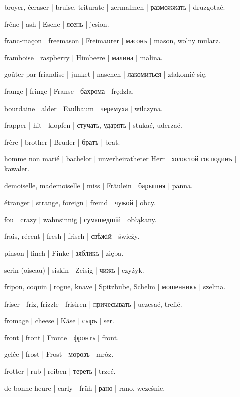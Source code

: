 \begin{outdent}{1em}
broyer, écraser | bruise, triturate | zermalmen | разможжать | druzgotać.

frêne | ash | Esche | ясень | jesion.

franc-maçon | freemason | Freimaurer | масонъ | mason,
wolny mularz.

framboise | raspberry | Himbeere | малина | malina.

goûter par friandise | junket | naschen | лакомиться | złakomić się.

frange | fringe | Franse | бахрома | frędzla.

bourdaine | alder | Faulbaum | черемуха | wilczyna.

frapper | hit | klopfen | стучать, ударять | stukać, uderzać.

frère | brother | Bruder | братъ | brat.

homme non marié | bachelor | unverheiratheter Herr | холостой
господинъ | kawaler.

\uvsubentry{}
demoiselle, mademoiselle | miss | Fräulein | барышня | panna.

étranger | strange, foreign | fremd | чужой | obcy.

fou | crazy | wahnsinnig | сумашедшій | obłąkany.

frais, récent | fresh | frisch | свѣжій | świeźy.

pinson | finch | Finke | зябликъ | zięba.

serin (oiseau) | siskin | Zeisig | чижъ | czyźyk.

fripon, coquin | rogue, knave | Spitzbube, Schelm | мошенникъ | szelma.

friser | friz, frizzle | frisiren | причесывать | uczesać,
trefić.

fromage | cheese | Käse | сыръ | ser.

front | front | Fronte | фронтъ | front.

gelée | frost | Frost | морозъ | mróz.

frotter | rub | reiben | тереть | trzeć.

de bonne heure | early | früh | рано | rano, wcześnie.


\end{outdent}
